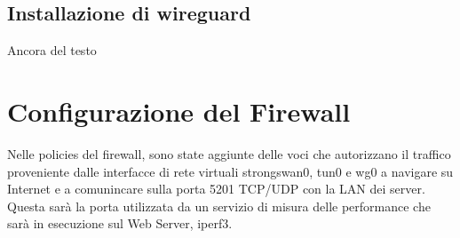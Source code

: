 \subsection{Installazione di wireguard}
Ancora del testo

\section{Configurazione del Firewall}
Nelle policies del firewall, sono state aggiunte delle voci che autorizzano il traffico proveniente dalle interfacce di rete virtuali strongswan0, tun0 e wg0 a navigare su Internet e a comunincare sulla porta 5201 TCP/UDP con la LAN dei server. Questa sarà la porta utilizzata da un servizio di misura delle performance che sarà in esecuzione sul Web Server, iperf3.